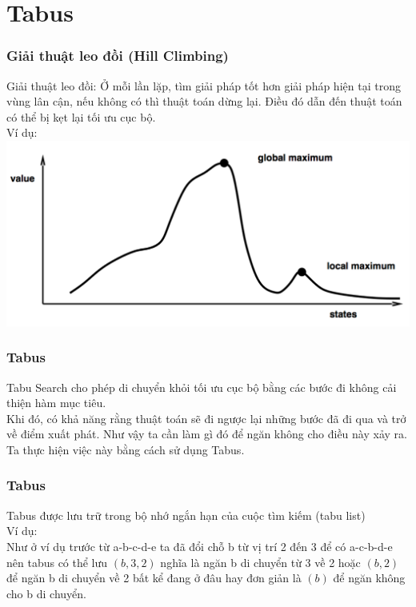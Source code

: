 \documentclass[12pt]{beamer}
\begin{document}
	\section{Tabus}
	\begin{frame}
		\frametitle{Giải thuật leo đồi (Hill Climbing)}
		Giải thuật leo đồi: Ở mỗi lần lặp, tìm giải pháp tốt hơn giải pháp hiện tại trong vùng lân cận, nếu không có thì thuật toán dừng lại. Điều đó dẫn đến thuật toán có thể bị kẹt lại tối ưu cục bộ.\\
		Ví dụ:\\
		\includegraphics[scale=0.4]{HillClimbing.png}\\
	\end{frame}
	
	\begin{frame}
		\frametitle{Tabus}
		Tabu Search cho phép di chuyển khỏi tối ưu cục bộ bằng các bước đi không cải thiện hàm mục tiêu.\\
		Khi đó, có khả năng rằng thuật toán sẽ đi ngược lại những bước đã đi qua và trở về điểm xuất phát. Như vậy ta cần làm gì đó để ngăn không cho điều này xảy ra.\\
		Ta thực hiện việc này bằng cách sử dụng Tabus.
	\end{frame}
	
	\begin{frame}
		\frametitle{Tabus}
		Tabus được lưu trữ trong bộ nhớ ngắn hạn của cuộc tìm kiếm (tabu list)\\
		Ví dụ:\\
		Như ở ví dụ trước từ a-b-c-d-e ta đã đổi chỗ b từ vị trí 2 đến 3 để có a-c-b-d-e nên tabus có thể lưu $(b, 3, 2)$ nghĩa là ngăn b di chuyển từ 3 về 2 hoặc $(b, 2)$ để ngăn b di chuyển về 2 bất kể đang ở đâu hay đơn giản là $(b)$ để ngăn không cho b di chuyển.
	\end{frame}
	
\end{document}
